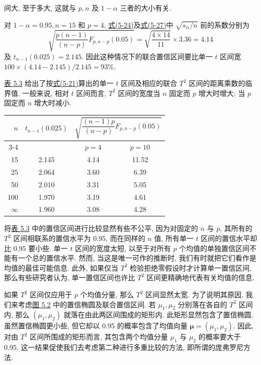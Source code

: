 间大, 至于多大, 这就与 $p,n$ 及 $1-\alpha$ 三者的大小有关.

对 $1-\alpha=0.95, n=15$ 和 $p=4$, \hyperref[eq:5-24]{式(5-24)}及\hyperref[eq:5-27]{式(5-27)}中 $\sqrt{s_{ii}/n}$ 前的系数分别为
\[
\sqrt{\frac{p(n-1)}{(n-p)}F_{p,n-p}(0.05)}=\sqrt{\frac{4\times14}{11}}\times3.36=4.14
\]
及 $t_{n-1}(0.025)=2.145$. 因此这种情况下的联合置信区间要比单一 $t$ 区间宽 $100\times(4.14-2.145)/2.145=93\%$.

\hyperref[tab:5.3]{表 5.3} 给出了按\hyperref[eq:5-21]{式(5-21)}算出的单一 $t$ 区间及相应的联合 $T^{2}$ 区间的距离乘数的临界值. 一般来说, 相对 $t$ 区间而言, $T^{2}$ 区间的宽度当 $n$ 固定而 $p$ 增大时增大; 当 $p$ 固定而 $n$ 增大时减小.

\begin{mvtable}
\label{tab:5.3}
\begin{tabular}{rccc}
\toprule
\multirow{2}{*}{$n$} & \multirow{2}{*}{$t_{n-1}(0.025)$} & \multicolumn{2}{c}{$\sqrt{\dfrac{(n-1)p}{(n-p)}F_{p,n-p}(0.05)}$}\\
\cmidrule(lr){3-4}
& & $p=4$ & $p=10$\\
\midrule
15 & 2.145 & 4.14 & 11.52\\
25 & 2.064 & 3.60 & 6.39\\
50 & 2.010 & 3.31 & 5.05\\
100 & 1.970 & 3.19 & 4.61\\
$\infty$ & 1.960 & 3.08 & 4.28\\
\bottomrule
\end{tabular}
\end{mvtable}

将\hyperref[tab:5.3]{表 5.3} 中的置信区间进行比较显然有些不公平, 因为对固定的 $n$ 与 $p$, 其所有的 $T^{2}$ 区间相联系的置信水平为 0.95, 而在同样的 $n$ 值, 所有单一 $t$ 区间的置信水平却比 0.95 要小些. 单一 $t$ 区间的宽度太短, 以至于对所有 $p$ 个均值的单独置信区间不能有一个总的置信水平. 然而, 当这是唯一可作的推断时, 我们有时就把它们看作是均值的最佳可能信息. 此外, 如果仅当 $T^{2}$ 检验拒绝零假设时才计算单一置信区间, 那么有些研究者认为, 单一置信区间也许比 $T^{2}$ 区间更精确地代表有关均值的信息.

如果 $T^{2}$ 区间仅应用于 $p$ 个均值分量, 那么 $T^{2}$ 区间显然太宽. 为了说明其原因, 我们来考虑\hyperref[fig:5.2]{图 5.2} 中的置信椭圆及联合置信区间. 若 $\mu_{1},\mu_{2}$ 分别落在各自的 $T^{2}$ 区间内, 那么 $(\mu_{1},\mu_{2})$ 就落在由此两区间围成的矩形内. 此矩形显然包含了置信椭圆, 虽然置信椭圆更小些, 但它却以 0.95 的概率包含了均值向量 $\boldsymbol{\mu}=(\mu_{1},\mu_{2})$. 因此, 对由 $T^{2}$ 区间所围成的矩形而言, 其包含两个均值分量 $\mu_{1}$ 与 $\mu_{2}$ 的概率要大于 0.95. 这一结果促使我们去考虑第二种进行多重比较的方法, 即所谓的庞弗罗尼方法.

